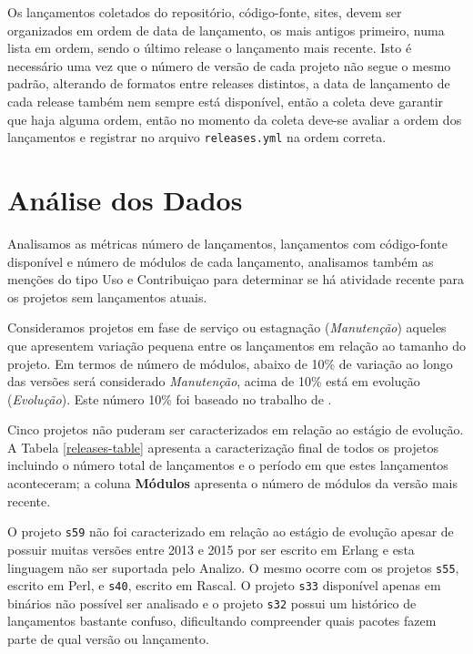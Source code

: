 Os lançamentos coletados do repositório, código-fonte, sites, devem ser
organizados em ordem de data de lançamento, os mais antigos primeiro, numa
lista em ordem, sendo o último release o lançamento mais recente. Isto é
necessário uma vez que o número de versão de cada projeto não segue o mesmo
padrão, alterando de formatos entre releases distintos, a data de lançamento de
cada release também nem sempre está disponível, então a coleta deve garantir
que haja alguma ordem, então no momento da coleta deve-se avaliar a ordem dos
lançamentos e registrar no arquivo \texttt{releases.yml} na ordem correta.


\section{Análise dos Dados} \label{estudo3:analise} %

Analisamos as métricas número de lançamentos, lançamentos com código-fonte disponível
e número de módulos de cada lançamento, 
analisamos também as
menções do tipo Uso e Contribuiçao para determinar se há atividade recente para
os projetos sem lançamentos atuais.

Consideramos projetos em fase de serviço ou estagnação ({\it Manutenção}) aqueles que
apresentem variação pequena entre os lançamentos em relação ao tamanho do
projeto. Em termos de número de módulos, abaixo de 10\% de variação ao longo
das versões será considerado {\it Manutenção}, acima de 10\% está em evolução
({\it Evolução}). Este número 10\% foi baseado no trabalho de
.

Cinco projetos não puderam ser caracterizados em relação ao estágio de
evolução. A Tabela \ref{releases-table} apresenta a caracterização final de
todos os projetos incluindo o número total de lançamentos e o período em que
estes lançamentos aconteceram; a coluna {\bf Módulos} apresenta o número de
módulos da versão mais recente.



O projeto \texttt{s59} não foi caracterizado em relação ao estágio de evolução
apesar de possuir muitas versões entre 2013 e 2015 por ser escrito em Erlang e
esta linguagem não ser suportada pelo Analizo. O mesmo ocorre com os projetos
\texttt{s55}, escrito em Perl, e \texttt{s40}, escrito em Rascal. O projeto
\texttt{s33} disponível apenas em binários não possível ser analisado e o
projeto \texttt{s32} possui um histórico de lançamentos bastante confuso,
dificultando compreender quais pacotes fazem parte de qual versão ou
lançamento.

